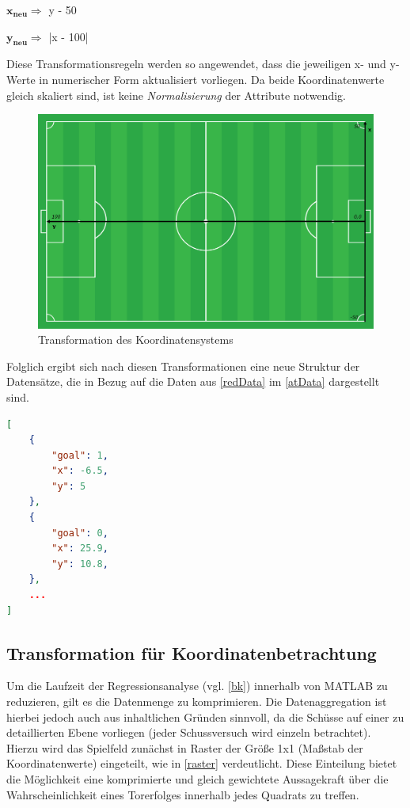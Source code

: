 \centerline{$\boldsymbol{x_{neu}} \Rightarrow$ y - 50 }
\centerline{$\boldsymbol{y_{neu}} \Rightarrow$ |x - 100|}

Diese Transformationsregeln werden so angewendet, dass die jeweiligen x- und y-Werte in numerischer Form aktualisiert vorliegen. Da beide Koordinatenwerte gleich skaliert sind, ist keine \textit{Normalisierung} der Attribute notwendig.

\begin{figure}[H]
\centering
\includegraphics[scale=0.27]{se-wa-jpg/transf_pitch}
\caption[Transformation des Koordinatensystems]{Transformation des Koordinatensystems}
\label{transf_pitch}
\end{figure}

\enlargethispage{2\baselineskip} Folglich ergibt sich nach diesen Transformationen eine neue Struktur der Datensätze, die in Bezug auf die Daten aus \vref{redData} im \vref{atData} dargestellt sind.\newline

\begin{lstlisting}[caption=\captionListingText,language=json,xleftmargin=5mm,label=atData] 
[
	{
		"goal": 1,
		"x": -6.5,
		"y": 5
	},
	{
		"goal": 0,
		"x": 25.9,
		"y": 10.8,
	},
	...
]
\end{lstlisting}

\subsection{Transformation für Koordinatenbetrachtung}
\label{kt}
Um die Laufzeit der Regressionsanalyse (vgl. \vref{bk}) innerhalb von MATLAB zu reduzieren, gilt es die Datenmenge zu komprimieren. Die Datenaggregation ist hierbei jedoch auch aus inhaltlichen Gründen sinnvoll, da die Schüsse auf einer zu detaillierten Ebene vorliegen (jeder Schussversuch wird einzeln betrachtet). Hierzu wird das Spielfeld zunächst in Raster der Größe \textsf{1x1} (Maßstab der Koordinatenwerte) eingeteilt, wie in \vref{raster} verdeutlicht. Diese Einteilung bietet die Möglichkeit eine komprimierte und gleich gewichtete Aussagekraft über die Wahrscheinlichkeit eines Torerfolges innerhalb jedes Quadrats zu treffen.

